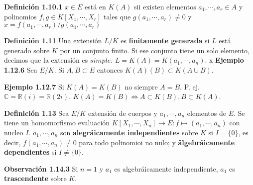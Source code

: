 \documentclass[a4paper, 11pt]{extarticle}
\newcommand{\defi}[1]{\textcolor{azul}{\textbf{Definición #1}}}
\newcommand{\obs}[1]{\textcolor{verde}{\textbf{Observación #1}}}
\newcommand{\ejem}[1]{\textcolor{verde}{\textbf{Ejemplo #1}}}
\begin{document}
\begin{multicols*}{2}
\defi{1.10.1} \(x \in E\) está en \(K(A)\) sii existen elementos \(a_1,
\cdots, a_r \in A\) y polinomios \(f,g \in K[X_1, \cdots, X_r]\) tales que \(g(a_1, \cdots, a_r) \neq 0\) y \(x = f(a_1, \cdots, a_r)/g(a_1, \cdots, a_r)\)

\defi{1.11} Una extensión \(L/K\) es \textbf{finitamente generada} si \(L\) está
generado sobre \(K\) por un conjunto finito. Si ese conjunto tiene un solo
elemento, decimos que la extensión es \(simple\).
\(L = K(A) = K(a_1, \cdots, a_n)\).
x
\ejem{1.12.6} Sea \(E/K\). Si \(A,B \subset E\) entonces \(K(A)(B) \subset
K(A \cup B)\).

\ejem{1.12.7} Si \(K(A) = K(B)\) no siempre \(A = B\). P. ej. \(\mathbb{C}
= \mathbb{R}(i) = \mathbb{R}(2i)\). \(K(A) = K(B) \iff A \subset K(B), B
\subset K(A)\).

\defi{1.13} Sea \(E/K\) extensión de cuerpos y \(a_1, \cdots, a_n\)
elementos de \(E\). Se tiene un homomorfismo evaluación \(K[X_1, \cdots, X_n]
\rightarrow  E: f \mapsto (a_1, \cdots, a_n)\) con nucleo \(I\). \(a_1,
\cdots, a_n\) son \textbf{alegráicamente independientes} sobre \(K\) si \(I = \{ 0 \}\), es decir,  \(f(a_1, \cdots, a_n) \neq 0\) para todo polinomioi no nulo; y
\textbf{âlgebráicamente dependientes} si \(I \neq \{ 0 \}\).

\obs{1.14.3} Si \(n = 1\) y \(a_1\) es algebráicamente independiente, \(a_1\) es \textbf{trascendente} sobre \(K\).




\end{multicols*}
\pagebreak
\end{document}

